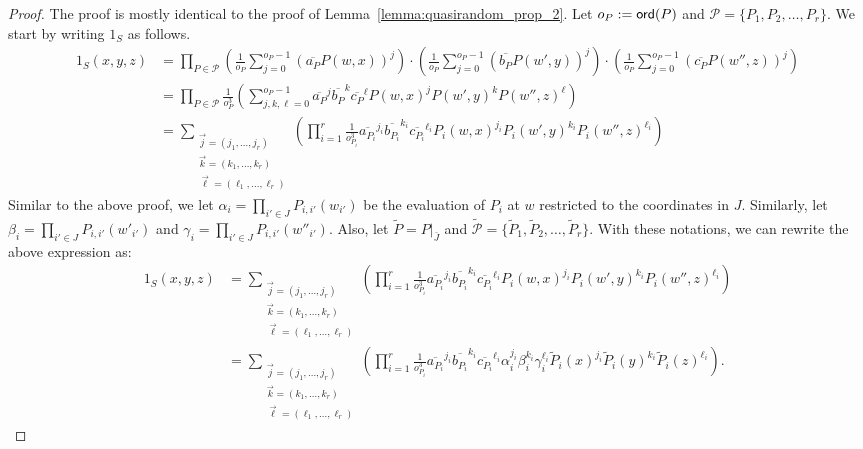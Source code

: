 \documentclass[10pt,a4paper]{amsart}
\begin{document}
\begin{proof}
    The proof is mostly identical to the proof of Lemma~\ref{lemma:quasirandom_prop_2}. Let $o_P:={\sf ord}(P)$ and $\mathcal{P} = \{ P_1, P_2, \ldots, P_r\}$. We start by writing $1_S$ as follows.
\begin{align*}
         1_S(x, y, z) &= {\prod_{P\in \mathcal{P}}\left( \frac{1}{o_P} \sum_{j=0}^{o_P-1}\left(\overline{a_P}P(w,x)\right)^j\right)\cdot \left( \frac{1}{o_P} \sum_{j=0}^{o_P-1}\left(\overline{b_P}P(w',y)\right)^j\right)\cdot \left( \frac{1}{o_P} \sum_{j=0}^{o_P-1}\left(\overline{c_P}P(w'',z)\right)^j\right)}\\
          &= {\prod_{P\in \mathcal{P}} \frac{1}{o_P^3}\left(  \sum_{j, k, \ell=0}^{o_P-1}\overline{a_P}^j \overline{b_P}^k \overline{c_P}^\ell P(w,x)^j P(w',y)^k P(w'',z)^\ell\right)}\\
         &= \sum_{\substack{\vec{j} = (j_1, \ldots, j_r) \\ \vec{k} = (k_1, \ldots, k_r) \\ \vec{\ell} = (\ell_1, \ldots, \ell_r)}}{\left(  \prod_{i=1}^r \frac{1}{o_{P_i}^3}\overline{a_{P_i}}^{j_i} \overline{b_{P_i}}^{k_i} \overline{c_{P_i}}^{\ell_i} P_i(w,x)^{j_i} P_i(w',y)^{k_i} P_i(w'',z)^{\ell_i}\right)}
         \end{align*}
         Similar to the above proof, we let $\alpha_i = \prod_{i'\in J} P_{i,i'}(w_{i'})$ be the evaluation of $P_i$ at $w$ restricted to the coordinates in $J$. Similarly, let  $\beta_i = \prod_{i'\in J} P_{i,i'}(w'_{i'})$ and  $\gamma_i = \prod_{i'\in J} P_{i,i'}(w''_{i'})$. Also, let $\tilde{P} = P|_{\bar{J}}$ and $\tilde{\mathcal{P}} = \{ \tilde{P}_1, \tilde{P}_2, \ldots, \tilde{P}_r\}$. With these notations, we can rewrite the above expression as:
\begin{align*}
         1_S(x, y, z) &= \sum_{\substack{\vec{j} = (j_1, \ldots, j_r) \\ \vec{k} = (k_1, \ldots, k_r) \\ \vec{\ell} = (\ell_1, \ldots, \ell_r)}}{\left(  \prod_{i=1}^r \frac{1}{o_{P_i}^3}\overline{a_{P_i}}^{j_i} \overline{b_{P_i}}^{k_i} \overline{c_{P_i}}^{\ell_i} P_i(w,x)^{j_i} P_i(w',y)^{k_i} P_i(w'',z)^{\ell_i}\right)}\\
        &= \sum_{\substack{\vec{j} = (j_1, \ldots, j_r) \\ \vec{k} = (k_1, \ldots, k_r) \\ \vec{\ell} = (\ell_1, \ldots, \ell_r)}}{\left(  \prod_{i=1}^r \frac{1}{o_{P_i}^3}\overline{a_{P_i}}^{j_i} \overline{b_{P_i}}^{k_i} \overline{c_{P_i}}^{\ell_i} \alpha_i^{j_i}\beta_i^{k_i}\gamma_i^{\ell_i}\tilde{P}_i(x)^{j_i} \tilde{P}_i(y)^{k_i} \tilde{P}_i(z)^{\ell_i}\right)}.

\end{align*}
\end{proof}
\end{document}
